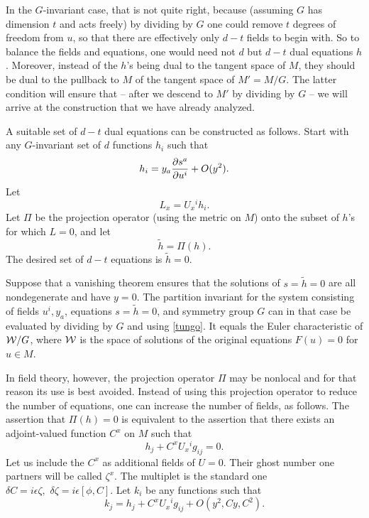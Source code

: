 \documentclass[12pt]{article}
\numberwithin{equation}{section}
\def\tilde{\widetilde}
\begin{document}
In the $G$-invariant case, that is not quite right, because (assuming
$G$ has dimension $t$ and acts freely) by dividing by $G$ one could
remove $t$ degrees of freedom from $u$, so that there are effectively
only $d-t$ fields to begin with.
So to balance the fields and equations,
one would need not $d$ but $d-t$ dual equations $h$.
Moreover, instead of the $h$'s being dual to the tangent space of
$M$, they should be dual to the pullback to $M$ of the tangent space
of $M'=M/G$.  The latter condition will ensure that -- after we descend
to $M'$ by dividing by $G$ -- we will arrive at the construction that we
have already analyzed.

A suitable set of $d-t$ dual equations can be constructed as follows.
Start with any $G$-invariant set of $d$ functions $h_i$ such that
\begin{equation}
  \label{hobo}
  h_i=y_a{\partial s^a\over\partial u^i}+O(y^2).
\end{equation}
Let
\begin{equation}
  \label{letthem}
  L_x= U_x{}^ih_i.
\end{equation}
Let $\Pi$ be the projection operator (using the metric on $M$) onto
the subset of $h$'s for which $L=0$, and let
\begin{equation}
  \label{newones}
  \tilde h=\Pi( h).
\end{equation}
The desired set of $d-t$ equations is $\tilde h=0$.

Suppose that a vanishing theorem ensures that the solutions of $s=\tilde h=0$
are all nondegenerate and have $y=0$.
The partition invariant for the system consisting of fields $u^i,y_a$,
equations $s=\tilde h=0$, and symmetry group $G$
can in that case be evaluated by dividing by $G$ and using \eqref{tungo}.
It equals the Euler
characteristic of ${\cal W}/G$, where ${\cal W}$ is the space of
solutions of the original equations $F(u)=0$ for $u\in M$.

\bigskip
{}

In field theory, however, the projection operator $\Pi$ may be nonlocal
and for that reason its use is best avoided.
Instead of using this projection operator to reduce the number of
equations, one can increase the number of fields, as follows.
The assertion that $\Pi (h)=0$ is equivalent to the assertion that
there exists an adjoint-valued function $C^x$ on $M$ such that
\begin{equation}
  \label{norf}
  h_j +C^x U_x{}^ig_{ij}= 0 .
\end{equation}
Let us include the $C^x$ as additional fields of $U=0$.  Their ghost
number one partners will be called $\zeta^x$.
The multiplet is the standard one $\delta C=i\epsilon\zeta,
\,\,\delta \zeta=i\epsilon[\phi,C]$.
Let $k_i$ be any functions such that
\begin{equation}
  \label{oggo}
  k_j=h_j +C^x U_x{}^ig_{ij}+O(y^2,Cy,C^2).
\end{equation}
\end{document}
